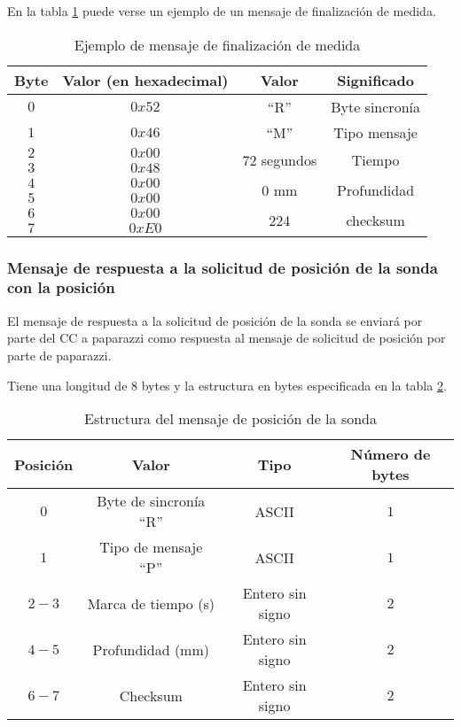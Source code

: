 En la tabla \ref{tab13} puede verse un ejemplo de un mensaje de finalización de medida.

\begin{table}[h]
	\centering
	\caption{Ejemplo de mensaje de finalización de medida}
	\begin{tabular}{|c|c|c|c|}\hline
		\textbf{Byte} 	&	\textbf{Valor (en hexadecimal)}	&\textbf{Valor}	&\textbf{Significado} \\ \hline \hline
		$0$ 			&  $0x52$			& ``R''	& Byte sincronía	\\ \hline
		$1$				&  $0x46$			& ``M''	& Tipo mensaje		\\ \hline
		$2$				&  $0x00$			& \multirow{2}{*}{$72$ segundos} & \multirow{2}{*}{Tiempo} \\
		$3$				&  $0x48$			&  & \\ \hline	
		$4$				&  $0x00$			& \multirow{2}{*}{$0$ mm} & \multirow{2}{*}{Profundidad} \\
		$5$				&  $0x00$			&  & \\ \hline	
		$6$				&  $0x00$			&  \multirow{2}{*}{224}	& \multirow{2}{*}{checksum} \\
		$7$				&  $0xE0$			&     &     \\ \hline	
		
		
	\end{tabular}
	\label{tab13}
\end{table}

\subsubsection{Mensaje de respuesta a la solicitud de posición de la sonda con la posición}

El mensaje de respuesta a la solicitud de posición de la sonda se enviará por parte del CC a paparazzi como respuesta al mensaje de solicitud de posición por parte de paparazzi.

Tiene una longitud de $8$ bytes y la estructura en bytes especificada en la tabla \ref{tab14}.

\begin{table}[h]
	\centering
	\caption{Estructura del mensaje de posición de la sonda}
	\begin{tabular}{|c|c|c|c|}\hline 
		\textbf{Posición}	& \textbf{Valor} & \textbf{Tipo} &\textbf{Número de bytes} \\ \hline \hline 
		$0$		& Byte de sincronía ``R''				& ASCII	 			&	$1$ \\  \hline
		$1$		& Tipo de mensaje ``P''				& ASCII	 			&	$1$ \\  \hline
		$2-3$	& Marca de tiempo (s)				& Entero sin signo	&   $2$ \\  \hline
		$4-5$	& Profundidad (mm)  				& Entero sin signo	&   $2$ \\  \hline
		$6-7$	& Checksum 							& Entero sin signo	&   $2$ \\  \hline
	\end{tabular}
	\label{tab14}
\end{table}

